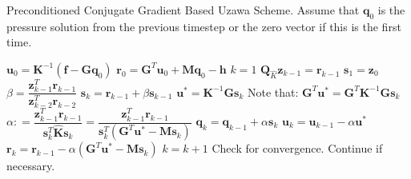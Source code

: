 \documentclass[a4paper]{article}
\newcommand{\bs}[1]{\boldsymbol{#1}}				%
\newcommand{\pc}{\mbox{${\boldsymbol Q}_{\hat K}$}}	%
\begin{document}
\begin{algorithm}
\caption{Preconditioned Conjugate Gradient Based Uzawa Scheme. Assume that  ${\boldsymbol q}_0$ is the pressure solution from the previous timestep or
the zero vector if this is the first time. \label{PCG_alg}}
\begin{algorithmic}[1]
	\State ${\boldsymbol u}_0 = {\boldsymbol K}^{-1} \left( {\boldsymbol f} - {\boldsymbol G}{\boldsymbol q}_0 \right)$
	\State ${\boldsymbol r}_0 = { \boldsymbol G}^T {\boldsymbol u}_0 + {\boldsymbol M}{\boldsymbol q}_0 - {\boldsymbol h}$  	%
	\State $k=1$		
		\State $\pc {\boldsymbol  z}_{k-1} = {\boldsymbol r}_{k-1}$ 		
			\State ${\boldsymbol s}_1 = {\boldsymbol z}_0$
		\Else{ }
			\State $\beta = \dfrac{{\boldsymbol z}_{k-1}^T {\boldsymbol r}_{k-1}}{{\boldsymbol z}_{k-2}^T {\boldsymbol r}_{k-2}}$
			\State ${\boldsymbol s}_k ={\boldsymbol  r}_{k-1} + \beta {\boldsymbol s}_{k-1}$
		\EndIf
		\State ${\boldsymbol u}^* = {\boldsymbol K} ^{-1}{\boldsymbol G}{\boldsymbol s}_k$ \label{u_star}	
		\State Note that: ${\boldsymbol G}^T {\boldsymbol u}^* = {\boldsymbol G}^T {\boldsymbol K}^{-1} {\boldsymbol G} {\boldsymbol s}_k$	
		\State $\alpha:
			= \dfrac{   {\boldsymbol  z}_{k-1}^T  {\boldsymbol r}_{k-1}    } {   {\boldsymbol  s}_{k}^T \widehat{\bs K} \bs s_k }
			=\dfrac{   {\boldsymbol  z}_{k-1}^T  {\boldsymbol r}_{k-1}    } {   {\boldsymbol  s}_{k}^T    \left(   {\boldsymbol G}^T {\boldsymbol u}^* - {\boldsymbol M} {\boldsymbol s}_{k}    \right) }$
		\State ${\boldsymbol q}_k = {\boldsymbol q}_{k-1} + \alpha {\boldsymbol s}_k$ \label{q_update}
		\State ${\boldsymbol u}_k = {\boldsymbol u}_{k-1} - \alpha {\boldsymbol u}^*$ \label{v_update}
		\State ${\boldsymbol r}_k = {\boldsymbol r}_{k-1} - \alpha \left( {\boldsymbol G}^T{\boldsymbol u}^* - {\boldsymbol M}{\boldsymbol s}_k   \right)$ \label{formal_residual}		
		\State $k = k +1$ 
		\State Check for convergence. Continue if necessary.
	\EndFor
\end{algorithmic}
\end{algorithm}
\end{document}
